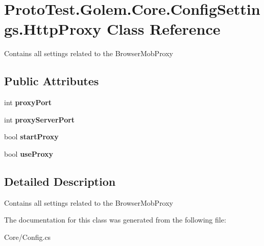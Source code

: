 \hypertarget{class_proto_test_1_1_golem_1_1_core_1_1_config_settings_1_1_http_proxy}{\section{Proto\-Test.\-Golem.\-Core.\-Config\-Settings.\-Http\-Proxy Class Reference}
\label{class_proto_test_1_1_golem_1_1_core_1_1_config_settings_1_1_http_proxy}
}


Contains all settings related to the Browser\-Mob\-Proxy  


\subsection*{Public Attributes}
\begin{DoxyCompactItemize}
\item 
\hypertarget{class_proto_test_1_1_golem_1_1_core_1_1_config_settings_1_1_http_proxy_aca0fd120d5276c25f54d657ad8a07288}{int {\bfseries proxy\-Port}}\label{class_proto_test_1_1_golem_1_1_core_1_1_config_settings_1_1_http_proxy_aca0fd120d5276c25f54d657ad8a07288}

\item 
\hypertarget{class_proto_test_1_1_golem_1_1_core_1_1_config_settings_1_1_http_proxy_aebb64efb30a16e6605c3cadcfed582d4}{int {\bfseries proxy\-Server\-Port}}\label{class_proto_test_1_1_golem_1_1_core_1_1_config_settings_1_1_http_proxy_aebb64efb30a16e6605c3cadcfed582d4}

\item 
\hypertarget{class_proto_test_1_1_golem_1_1_core_1_1_config_settings_1_1_http_proxy_a1eba9f77cd621b68182717cddf640e5d}{bool {\bfseries start\-Proxy}}\label{class_proto_test_1_1_golem_1_1_core_1_1_config_settings_1_1_http_proxy_a1eba9f77cd621b68182717cddf640e5d}

\item 
\hypertarget{class_proto_test_1_1_golem_1_1_core_1_1_config_settings_1_1_http_proxy_a913cb3b529587ba3a9d258c662d09c90}{bool {\bfseries use\-Proxy}}\label{class_proto_test_1_1_golem_1_1_core_1_1_config_settings_1_1_http_proxy_a913cb3b529587ba3a9d258c662d09c90}

\end{DoxyCompactItemize}


\subsection{Detailed Description}
Contains all settings related to the Browser\-Mob\-Proxy 



The documentation for this class was generated from the following file\-:\begin{DoxyCompactItemize}
\item 
Core/Config.\-cs\end{DoxyCompactItemize}
